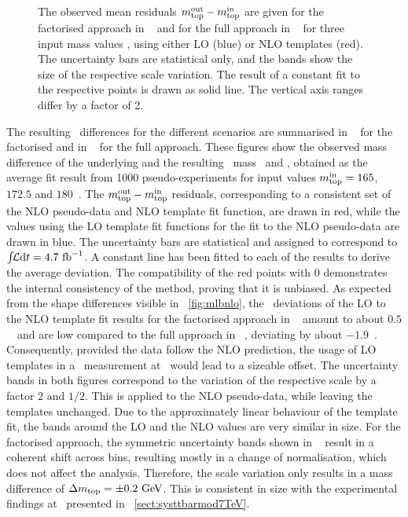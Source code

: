 \begin{figure}[tbp!]
{%
The observed mean residuals $m_{\mathrm{top}}^{\mathrm{out}}-m_{\mathrm{top}}^{\mathrm{in}}$ are given for the factorised approach in \fig~ and for the full approach in \fig~ for three input mass values \mtin, using either \gls{LO} (blue) or \gls{NLO} templates (red). 
%
The uncertainty bars are statistical only, and the bands show the size of the respective scale variation. 
%
The result of a constant fit to the respective points is drawn as solid line.
%
The vertical axis ranges differ by a factor of 2.
%
}
%
\label{fig:NLOeffects}
\end{figure}
%

The resulting \mt\ differences for the different scenarios are summarised in \fig~ for the factorised and in \fig~ for the full approach. These figures show the observed mass difference of the underlying and the resulting \tquark\ mass \mtin\ and \mtout, obtained as the average fit result from 1000 pseudo-experiments for input values $m_{\mathrm{top}}^{\mathrm{in}}=165$, $172.5$ and $180$~\GeV. The $m_{\mathrm{top}}^{\mathrm{out}}-m_{\mathrm{top}}^{\mathrm{in}}$ residuals, corresponding to a consistent set of the \gls{NLO} pseudo-data and \gls{NLO} template fit function, are drawn in red, while the values using the \gls{LO} template fit functions for the fit to the \gls{NLO} pseudo-data are drawn in blue. The uncertainty bars are statistical and assigned to correspond to $\int\!\!{\mathcal L}\mathrm{d}t=4.7~\mathrm{fb}^{-1}$. A constant line has been fitted to each of the results to derive the average deviation. 
%
The compatibility of the red points with 0 demonstrates the internal consistency of the method, proving that it is unbiased. 
%
As expected from the shape differences visible in \fig~\ref{fig:mlbnlo}, the \mt\ deviations of the \gls{LO} to the \gls{NLO} template fit results for the factorised approach in \fig~ amount to about $0.5$~\GeV\ and are low compared to the full approach in \fig~, deviating by about $-1.9$~\GeV.
%
Consequently, provided the data follow the \gls{NLO} prediction, the usage of \gls{LO} templates in a \mt\ measurement at \recolevel\ would lead to a sizeable offset. 
%
The uncertainty bands in both figures correspond to the variation of the respective scale by a factor $2$ and $1/2$. This is applied to the \gls{NLO} pseudo-data, while leaving the templates unchanged. Due to the approximately linear behaviour of the template fit, the bands around the \gls{LO} and the \gls{NLO} values are very similar in size.
%
For the factorised approach, the symmetric uncertainty bands shown in \fig~ result in a coherent shift across bins, resulting mostly in a change of normalisation, which does not affect the analysis. Therefore, the scale variation  only results in a mass difference of $\Delta m_{\mathrm{top}}=\pm0.2~\mathrm{GeV}$. This is consistent in size with the experimental findings at \recolevel\ presented in \sect~\ref{sect:systtbarmod7TeV}. 
